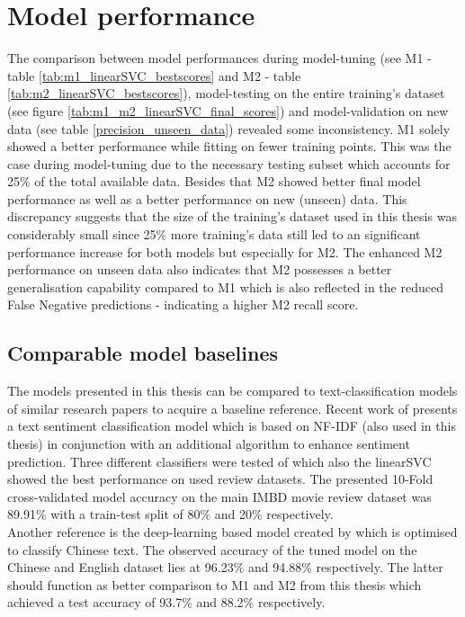\section{Model performance} \label{disussion_model_performance}
The comparison between model performances during model-tuning (see M1 - table \ref{tab:m1_linearSVC_bestscores} and M2 - table \ref{tab:m2_linearSVC_bestscores}), model-testing on the entire training's dataset (see figure \ref{tab:m1_m2_linearSVC_final_scores}) and model-validation on new data (see table \ref{precision_unseen_data}) revealed some inconsistency. M1 solely showed a better performance while fitting on fewer training points. This was the case during model-tuning due to the necessary testing subset which accounts for 25\% of the total available data. Besides that M2 showed better final model performance as well as a better performance on new (unseen) data. This discrepancy suggests that the size of the training's dataset used in this thesis was considerably small since 25\% more training's data still led to an significant performance increase for both models but especially for M2. The enhanced M2 performance on unseen data also indicates that M2 possesses a better generalisation capability compared to M1 which is also reflected in the reduced False Negative predictions - indicating a higher M2 recall score.

\subsection*{Comparable model baselines} \label{model_baseline}
The models presented in this thesis can be compared to text-classification models of similar research papers to acquire a baseline reference. Recent work of \textcite{Das2018} presents a text sentiment classification model which is based on NF-IDF (also used in this thesis) in conjunction with an additional algorithm to enhance sentiment prediction. Three different classifiers were tested of which also the linearSVC showed the best performance on used review datasets. The presented 10-Fold cross-validated model accuracy on the main IMBD movie review dataset was 89.91\% with a train-test split of 80\% and 20\% respectively.\\
Another reference is the deep-learning based model created by \textcite{Li2018} which is optimised to classify Chinese text. The observed accuracy of the tuned model on the Chinese and English dataset lies at 96.23\% and 94.88\% respectively. The latter should function as better comparison to M1 and M2 from this thesis which achieved a test accuracy of 93.7\% and 88.2\% respectively.

